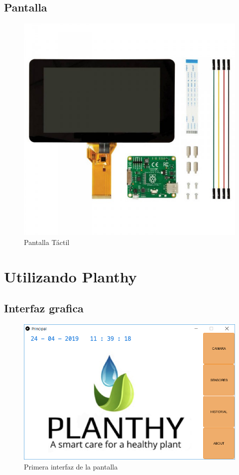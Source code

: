 \documentclass[12pt]{article}
\begin{document}
\subsection{Pantalla}

\begin{figure}[H]
	\centering
	\includegraphics[scale=.5]{pantalla}
	\caption{Pantalla Táctil}
	\label{fig:pantalla}
\end{figure}

\newpage

\section{Utilizando Planthy}

\subsection{Interfaz grafica}

\begin{figure}[H]
	\centering
	\includegraphics[scale=.6]{intro}
	\caption{Primera interfaz de la pantalla}
	\label{fig:intro}
\end{figure}
\end{document}
